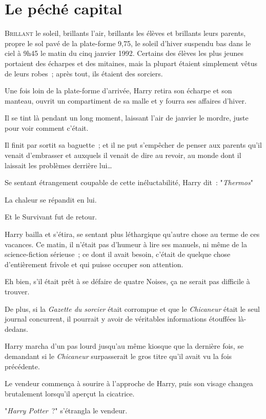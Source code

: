 \chapter{Le péché capital}

\lettrine{B}{rillant} le soleil, brillants l'air, brillants les élèves et brillants leurs parents, propre le sol pavé de la plate-forme 9,75, le soleil d'hiver suspendu bas dans le ciel à 9h45 le matin du cinq janvier 1992. Certains des élèves les plus jeunes portaient des écharpes et des mitaines, mais la plupart étaient simplement vêtus de leurs robes~; après tout, ils étaient des sorciers.

Une fois loin de la plate-forme d'arrivée, Harry retira son écharpe et son manteau, ouvrit un compartiment de sa malle et y fourra ses affaires d'hiver.

Il se tint là pendant un long moment, laissant l'air de janvier le mordre, juste pour voir comment c'était.

Il finit par sortit sa baguette~; et il ne put s'empêcher de penser aux parents qu'il venait d'embrasser et auxquels il venait de dire au revoir, au monde dont il laissait les problèmes derrière lui…

Se sentant étrangement coupable de cette inéluctabilité, Harry dit~: "\emph{Thermos}"

La chaleur se répandit en lui.

Et le Survivant fut de retour.

Harry bailla et s'étira, se sentant plus léthargique qu'autre chose au terme de ces vacances. Ce matin, il n'était pas d'humeur à lire ses manuels, ni même de la science-fiction sérieuse~; ce dont il avait besoin, c'était de quelque chose d'entièrement frivole et qui puisse occuper son attention.

Eh bien, s'il était prêt à se défaire de quatre Noises, ça ne serait pas difficile à trouver.

De plus, si la \emph{Gazette du sorcier} était corrompue et que le \emph{Chicaneur} était le seul journal concurrent, il pourrait y avoir de véritables informations étouffées là-dedans.

Harry marcha d'un pas lourd jusqu'au même kiosque que la dernière fois, se demandant si le \emph{Chicaneur} surpasserait le gros titre qu'il avait vu la fois précédente.

Le vendeur commença à sourire à l'approche de Harry, puis son visage changea brutalement lorsqu'il aperçut la cicatrice.

"\emph{Harry Potter}~?" s'étrangla le vendeur.

